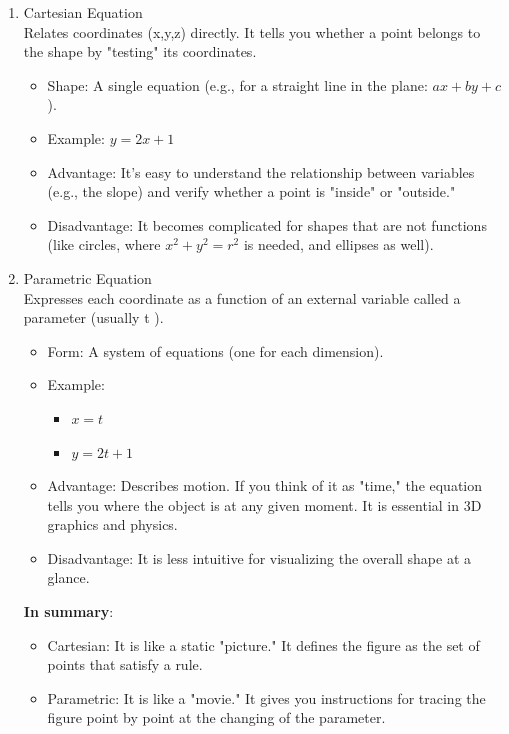 \documentclass[a4paper,10pt]{article}
\begin{document}
\begin{enumerate}
\item Cartesian Equation\\
Relates coordinates (x,y,z) directly. It tells you whether a point belongs to the shape by "testing" its coordinates.
\begin{itemize}
\item Shape: A single equation (e.g., for a straight line in the plane: $ ax + by + c $ ).
\item Example: $ y = 2x + 1 $
\item Advantage: It's easy to understand the relationship between variables (e.g., the slope) and verify whether a point is "inside" or "outside."
\item Disadvantage: It becomes complicated for shapes that are not functions (like circles, where $ x^2 + y^2 = r^2 $ is needed, and ellipses as well).
\end{itemize}
\item Parametric Equation\\
Expresses each coordinate as a function of an external variable called a parameter (usually t ).
\begin{itemize}
\item Form: A system of equations (one for each dimension).
\item Example:
\begin{itemize}
\item $ x = t $
\item $ y = 2t + 1 $
\end{itemize}
\item Advantage: Describes motion. If you think of it as "time," the equation tells you where the object is at any given moment. It is essential in 3D graphics and physics.
\item Disadvantage: It is less intuitive for visualizing the overall shape at a glance.
\end{itemize}
\textbf{In summary}:
\begin{itemize}
\item Cartesian: It is like a static "picture." It defines the figure as the set of points that satisfy a rule.
\item Parametric: It is like a "movie." It gives you instructions for tracing the figure point by point at the changing of the parameter.
\end{itemize}
\end{enumerate}
\newpage
\end{document}
